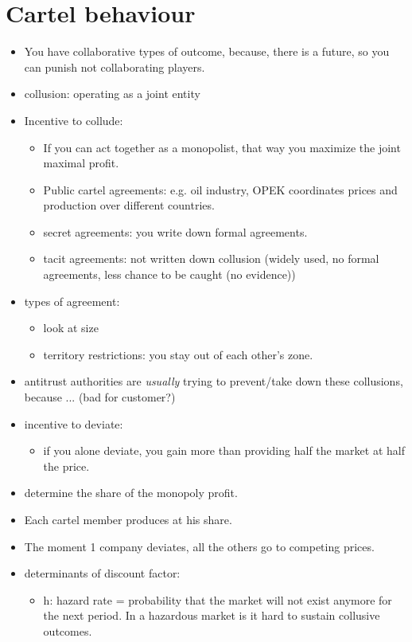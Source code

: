 \documentclass[12pt, a4paper, titlepage]{extarticle}
\begin{document}
\section{Cartel behaviour}
\begin{itemize}
    \item You have collaborative types of outcome, because, there is a future, so you can punish not collaborating players.
    \item collusion: operating as a joint entity
    \item Incentive to collude:
    \begin{itemize}
        \item If you can act together as a monopolist, that way you maximize the joint maximal profit.
        \item Public cartel agreements: e.g. oil industry, OPEK coordinates prices and production over different countries.
        \item secret agreements: you write down formal agreements.
        \item tacit agreements: not written down collusion (widely used, no formal agreements, less chance to be caught (no evidence))
    \end{itemize}
    \item types of agreement:
    \begin{itemize}
        \item look at size
        \item territory restrictions: you stay out of each other's zone.
    \end{itemize}
    \item antitrust authorities are \emph{usually} trying to prevent/take down these collusions, because ... (bad for customer?)
    \item incentive to deviate:
    \begin{itemize}
        \item if you alone deviate, you gain more than providing half the market at half the price.
    \end{itemize}
    \item determine the share of the monopoly profit.
    \item Each cartel member produces at his share.
    \item The moment 1 company deviates, all the others go to competing prices.
    \item determinants of discount factor:
    \begin{itemize}
    \item h: hazard rate = probability that the market will not exist anymore for the next period. In a hazardous market is it hard to sustain collusive outcomes.
    \end{itemize}
\end{itemize}
\end{document}
